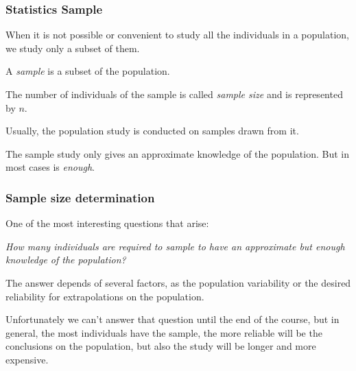 \begin{frame}
\frametitle{Statistics Sample}
When it is not possible or convenient to study all the individuals in a population, we study only a subset of them. 

\begin{definition}[Sample]
A \emph{sample} is a subset of the population.
\end{definition}

\begin{definition}
The number of individuals of the sample is called \emph{sample size} and is represented by $n$.
\end{definition}

Usually, the population study is conducted on samples drawn from it. 

The sample study only gives an approximate knowledge of the population. But in most cases is \emph{enough}.
\end{frame}


\begin{frame}
\frametitle{Sample size determination}
One of the most interesting questions that arise:
\begin{center}
\alert{\emph{How many individuals are required to sample to have an approximate but enough knowledge of the
population?}}
\end{center}

The answer depends of several factors, as the population variability or the desired reliability for extrapolations on
the population.

Unfortunately we can't answer that question until the end of the course, but in general, the most individuals have the
sample, the more reliable will be the conclusions on the population, but also the study will be longer and more
expensive.
\end{frame}


